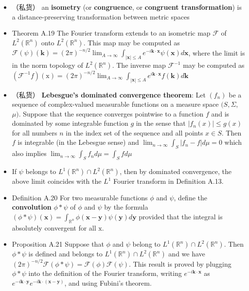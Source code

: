 \begin{itemize}
\item （私货） an \textbf{isometry} (or \textbf{congruence}, or \textbf{congruent transformation}) is a distance-preserving transformation between metric spaces

\item Theorem A.19 The Fourier transform extends to an isometric map $\mathcal{F}$ of $L^{2}\left(\mathbb{R}^{n}\right)$ onto $L^{2}\left(\mathbb{R}^{n}\right)$. This map may be computed as $\mathcal{F}(\psi)(\mathbf{k})=(2 \pi)^{-n / 2} \lim _{A \rightarrow \infty} \int_{|\mathbf{x}| \leq A} e^{-i \mathbf{k} \cdot \mathbf{x}} \psi(\mathbf{x}) d \mathbf{x}$, where the limit is in the norm topology of $L^{2}\left(\mathbb{R}^{n}\right)$. The inverse map $\mathcal{F}^{-1}$ may be computed as $\left(\mathcal{F}^{-1} f\right)(\mathrm{x})=(2 \pi)^{-n / 2} \lim _{A \rightarrow \infty} \int_{|\mathbf{x}| \leq A} e^{i \mathbf{k} \cdot \mathbf{x}} f(\mathbf{k}) d \mathbf{k}$

\item （私货） \textbf{Lebesgue's dominated convergence theorem}: Let $\left(f_{n}\right)$ be a sequence of complex-valued measurable functions on a measure space $(S, \Sigma$, $\mu)$. Suppose that the sequence converges pointwise to a function $f$ and is dominated by some integrable function $g$ in the sense that $\left|f_{n}(x)\right| \leq g(x)$ for all numbers $n$ in the index set of the sequence and all points $x \in S$. Then $f$ is integrable (in the Lebesgue sense) and
$\lim _{n \rightarrow \infty} \int_{S}\left|f_{n}-f\right| d \mu=0$ which also implies $\lim _{n \rightarrow \infty} \int_{S} f_{n} d \mu=\int_{S} f d \mu$

\item If $\psi$ belongs to $L^{1}\left(\mathbb{R}^{n}\right) \cap L^{2}\left(\mathbb{R}^{n}\right)$, then by dominated convergence, the above limit coincides with the $L^{1}$ Fourier transform in Definition A.13.

\item Definition A.20 For two measurable functions $\phi$ and $\psi$, define the \textbf{convolution} $\phi * \psi$ of $\phi$ and $\psi$ by the formula $(\phi * \psi)(\mathbf{x})=\int_{\mathbb{R}^{n}} \phi(\mathbf{x}-\mathbf{y}) \psi(\mathbf{y}) d \mathbf{y}$ provided that the integral is absolutely convergent for all $\mathrm{x}$.

\item Proposition A.21 Suppose that $\phi$ and $\psi$ belong to $L^{1}\left(\mathbb{R}^{n}\right) \cap L^{2}\left(\mathbb{R}^{n}\right)$. Then $\phi * \psi$ is defined and belongs to $L^{1}\left(\mathbb{R}^{n}\right) \cap L^{2}\left(\mathbb{R}^{n}\right)$ and we have $(2 \pi)^{-n / 2} \mathcal{F}(\phi * \psi)=\mathcal{F}(\phi) \mathcal{F}(\psi)$. This result is proved by plugging $\phi * \psi$ into the definition of the Fourier transform, writing $e^{-i \mathbf{k} \cdot \mathbf{x}}$ as $e^{-i \mathbf{k} \cdot \mathbf{y}} e^{-i \mathbf{k} \cdot(\mathbf{x}-\mathbf{y})}$, and using Fubini's theorem.


\end{itemize}
